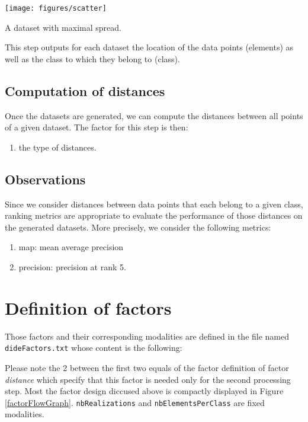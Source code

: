 \documentclass[12pt,a4paper,fleqn]{tufte-handout}
\begin{document}
\begin{marginfigure}
\texttt{[image: figures/scatter]}
\caption{A dataset with maximal spread.}
\label{scatter}
\end{marginfigure}

This step outputs for each dataset the location of the data points (elements) as well as the class to which they belong to (class).

\subsection{Computation of distances}

Once the datasets are generated, we can compute the distances between all points of a given dataset. The factor for this step is then:
\begin{enumerate}
\item the type of distances.
\end{enumerate}

\subsection{Observations}

Since we consider distances between data points that each belong to a given class, ranking metrics are appropriate to evaluate the performance of those distances on the generated datasets. More precisely, we consider the following metrics:
\begin{enumerate}
\item map: mean average precision
\item precision: precision at rank 5.
\end{enumerate}

\section{Definition of factors}

Those factors and their corresponding modalities are defined in the file named \texttt{dideFactors.txt} whose content is the following:


Please note the 2 between the first two equals of the factor definition of factor \textit{distance} which specify that this factor is needed only for the second processing step. Most the factor design diccused above is compactly displayed in Figure \ref{factorFlowGraph}. \texttt{nbRealizations} and \texttt{nbElementsPerClass} are fixed modalities.
\end{document}
